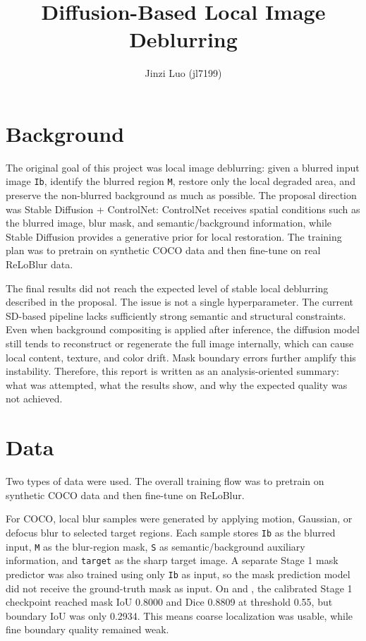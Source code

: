\documentclass[11pt]{article}
\title{Diffusion-Based Local Image Deblurring}
\author{Jinzi Luo (jl7199)}
\date{}
\begin{document}
\maketitle

\section{Background}

The original goal of this project was local image deblurring: given a blurred input image \texttt{Ib}, identify the blurred region \texttt{M}, restore only the local degraded area, and preserve the non-blurred background as much as possible.
The proposal direction was Stable Diffusion + ControlNet: ControlNet receives spatial conditions such as the blurred image, blur mask, and semantic/background information, while Stable Diffusion provides a generative prior for local restoration.
The training plan was to pretrain on synthetic COCO data and then fine-tune on real ReLoBlur data.

The final results did not reach the expected level of stable local deblurring described in the proposal.
The issue is not a single hyperparameter.
The current SD-based pipeline lacks sufficiently strong semantic and structural constraints.
Even when background compositing is applied after inference, the diffusion model still tends to reconstruct or regenerate the full image internally, which can cause local content, texture, and color drift.
Mask boundary errors further amplify this instability.
Therefore, this report is written as an analysis-oriented summary: what was attempted, what the results show, and why the expected quality was not achieved.

\section{Data}

Two types of data were used.
The overall training flow was to pretrain on synthetic COCO data and then fine-tune on ReLoBlur.

For COCO, local blur samples were generated by applying motion, Gaussian, or defocus blur to selected target regions.
Each sample stores \texttt{Ib} as the blurred input, \texttt{M} as the blur-region mask, \texttt{S} as semantic/background auxiliary information, and \texttt{target} as the sharp target image.
A separate Stage 1 mask predictor was also trained using only \texttt{Ib} as input, so the mask prediction model did not receive the ground-truth mask as input.
On \texttt{} and \texttt{}, the calibrated Stage 1 checkpoint reached mask IoU 0.8000 and Dice 0.8809 at threshold 0.55, but boundary IoU was only 0.2934.
This means coarse localization was usable, while fine boundary quality remained weak.
\end{document}
